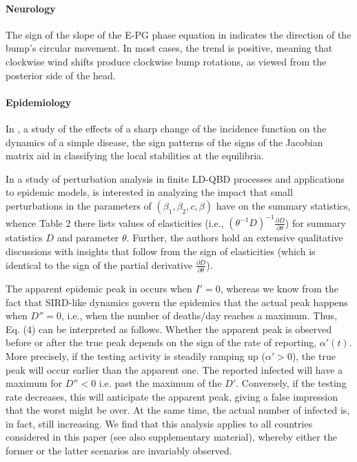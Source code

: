 \documentclass[11pt]{book}
\begin{document}
\paragraph{Neurology}

The sign of the slope of the E-PG phase equation in \cite{okubo2020neural}
indicates the direction of the bump's circular movement. In most
cases, the trend is positive, meaning that clockwise wind shifts produce
clockwise bump rotations, as viewed from the posterior side of the
head.


\paragraph{Epidemiology}

In \cite{arino2010effect}, a study of the effects of a sharp change of the incidence
function on the dynamics of a simple disease, the sign patterns of the signs of the Jacobian
matrix aid in classifying the local stabilities at the equilibria.

In a study of perturbation analysis in finite LD-QBD
processes and applications to epidemic models, \cite{gomez2018perturbation} is interested in analyzing the impact
that small perturbations in the parameters of $\left(\beta_{1},\beta_{2},c,\beta\right)$
have on the summary statistics, whence Table 2 there lists values
of elasticities (i.e., $\left(\theta^{-1}D\right)^{-1}\frac{\partial D}{\partial\theta}$)
for summary statistics $D$ and parameter $\theta$. Further, the
authors hold an extensive qualitative discussions with insights that
follow from the sign of elasticities (which is identical to the sign
of the partial derivative $\frac{\partial D}{\partial\theta}$).

The apparent epidemic peak in \cite{carletti2020covid} occurs when
$I'=0$, whereas we know from the fact that SIRD-like dynamics govern
the epidemics that the actual peak happens when $D''=0$, i.e., when
the number of deaths/day reaches a maximum. Thus, Eq. (4) can be interpreted
as follows. Whether the apparent peak is observed before or after
the true peak depends on the sign of the rate of reporting, $\alpha'\left(t\right)$.
More precisely, if the testing activity is steadily ramping up ($\alpha'>0$),
the true peak will occur earlier than the apparent one. The reported
infected will have a maximum for $D''<0$ i.e. past the maximum of
the $D'$. Conversely, if the testing rate decreases, this will anticipate
the apparent peak, giving a false impression that the worst might
be over. At the same time, the actual number of infected is, in fact,
still increasing. We find that this analysis applies to all countries
considered in this paper (see also supplementary material), whereby
either the former or the latter scenarios are invariably observed.
\end{document}
